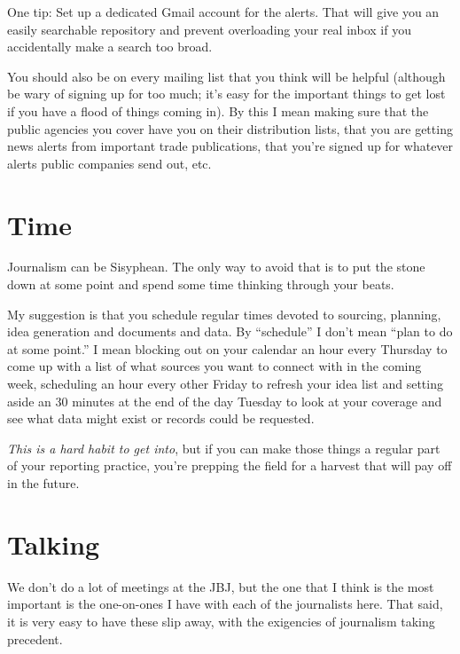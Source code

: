 \documentclass[
  11pt,
  american,
  letterpaperpaper,
  extrafontsizes,onecolumn,openright
  ]{memoir}
\begin{document}
One tip: Set up a dedicated Gmail account for the alerts. That will give you an easily searchable repository and prevent overloading your real inbox if you accidentally make a search too broad.

You should also be on every mailing list that you think will be helpful (although be wary of signing up for too much; it's easy for the important things to get lost if you have a flood of things coming in). By this I mean making sure that the public agencies you cover have you on their distribution lists, that you are getting news alerts from important trade publications, that you're signed up for whatever alerts public companies send out, etc.

\hypertarget{time}{%
\section*{Time}\label{time}}

Journalism can be Sisyphean. The only way to avoid that is to put the stone down at some point and spend some time thinking through your beats.

My suggestion is that you schedule regular times devoted to sourcing, planning, idea generation and documents and data. By \enquote{schedule} I don't mean \enquote{plan to do at some point.} I mean blocking out on your calendar an hour every Thursday to come up with a list of what sources you want to connect with in the coming week, scheduling an hour every other Friday to refresh your idea list and setting aside an 30 minutes at the end of the day Tuesday to look at your coverage and see what data might exist or records could be requested.

\emph{This is a hard habit to get into}, but if you can make those things a regular part of your reporting practice, you're prepping the field for a harvest that will pay off in the future.

\hypertarget{talking}{%
\section*{Talking}\label{talking}}

We don't do a lot of meetings at the JBJ, but the one that I think is the most important is the one-on-ones I have with each of the journalists here. That said, it is very easy to have these slip away, with the exigencies of journalism taking precedent.
\end{document}
